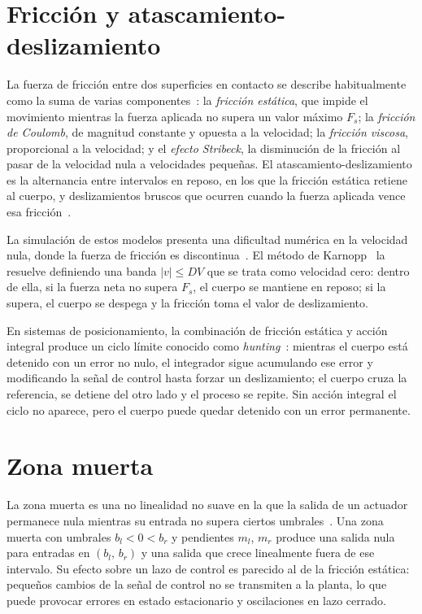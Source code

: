 \section{Fricción y atascamiento-deslizamiento}

La fuerza de fricción entre dos superficies en contacto se describe habitualmente como la suma de varias componentes~\cite{olsson,armstrong}: la \emph{fricción estática}, que impide el movimiento mientras la fuerza aplicada no supera un valor máximo $F_s$; la \emph{fricción de Coulomb}, de magnitud constante y opuesta a la velocidad; la \emph{fricción viscosa}, proporcional a la velocidad; y el \emph{efecto Stribeck}, la disminución de la fricción al pasar de la velocidad nula a velocidades pequeñas. El atascamiento-deslizamiento es la alternancia entre intervalos en reposo, en los que la fricción estática retiene al cuerpo, y deslizamientos bruscos que ocurren cuando la fuerza aplicada vence esa fricción~\cite{berman,armstrong}.

La simulación de estos modelos presenta una dificultad numérica en la velocidad nula, donde la fuerza de fricción es discontinua~\cite{haessig}. El método de Karnopp~\cite{karnopp} la resuelve definiendo una banda $|v|\le DV$ que se trata como velocidad cero: dentro de ella, si la fuerza neta no supera $F_s$, el cuerpo se mantiene en reposo; si la supera, el cuerpo se despega y la fricción toma el valor de deslizamiento.

En sistemas de posicionamiento, la combinación de fricción estática y acción integral produce un ciclo límite conocido como \emph{hunting}~\cite{olsson,armstrong}: mientras el cuerpo está detenido con un error no nulo, el integrador sigue acumulando ese error y modificando la señal de control hasta forzar un deslizamiento; el cuerpo cruza la referencia, se detiene del otro lado y el proceso se repite. Sin acción integral el ciclo no aparece, pero el cuerpo puede quedar detenido con un error permanente.

\section{Zona muerta}

La zona muerta es una no linealidad no suave en la que la salida de un actuador permanece nula mientras su entrada no supera ciertos umbrales~\cite{gang}. Una zona muerta con umbrales $b_l<0<b_r$ y pendientes $m_l$, $m_r$ produce una salida nula para entradas en $(b_l,\,b_r)$ y una salida que crece linealmente fuera de ese intervalo. Su efecto sobre un lazo de control es parecido al de la fricción estática: pequeños cambios de la señal de control no se transmiten a la planta, lo que puede provocar errores en estado estacionario y oscilaciones en lazo cerrado.

